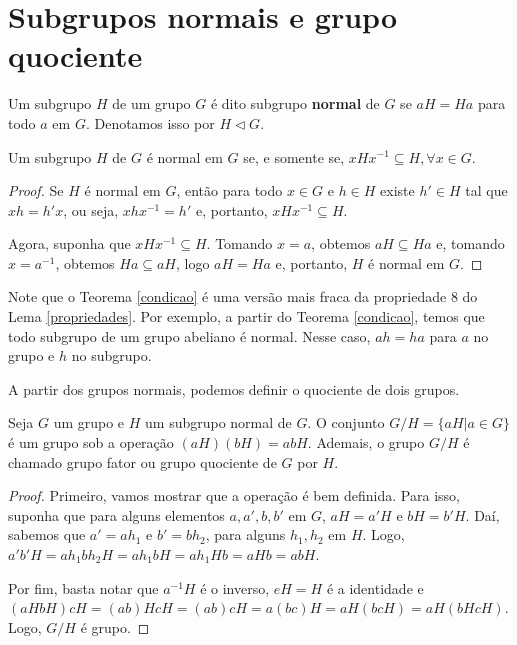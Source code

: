 \section{Subgrupos normais e grupo quociente}
\label{sec-subgrupos-normais}

    \begin{deff}
		Um subgrupo $H$ de um grupo $G$ é dito subgrupo \textbf{normal} de $G$ se $aH = Ha$ para todo $a$ em $G$. Denotamos isso por $H\vartriangleleft G$.
	\end{deff}
	
	\begin{theorem}
		\label{condicao}
		Um subgrupo $H$ de $G$ é normal em $G$ se, e somente se, $xHx^{-1}\subseteq H, \forall x\in G$. 
	\end{theorem} 
	
	\begin{proof}
		Se $H$ é normal em $G$, então para todo $x\in G$ e $h\in H$ existe $h'\in H$ tal que $xh = h'x$, ou seja, $xhx^{-1} = h'$ e, portanto, $xHx^{-1}\subseteq H.$
		\par\vspace{0.3cm} Agora, suponha que $xHx^{-1}\subseteq H$. Tomando $x=a$, obtemos $aH\subseteq Ha$ e, tomando $x = a^{-1}$, obtemos $Ha\subseteq aH$, logo $aH = Ha$ e, portanto, $H$ é normal em $G$.
	\end{proof}
	\par\vspace{0.3cm} Note que o Teorema \eqref{condicao} é uma versão mais fraca da propriedade 8 do Lema \eqref{propriedades}. Por exemplo, a partir do Teorema \eqref{condicao}, temos que todo subgrupo de um grupo abeliano é normal. Nesse caso, $ah = ha$ para $a$ no grupo e $h$ no subgrupo. 
	\par\vspace{0.3cm} A partir dos grupos normais, podemos definir o quociente de dois grupos.
	
	\begin{theorem}
		\label{quociente}
		Seja $G$ um grupo e $H$ um subgrupo normal de $G$. O conjunto $G/H = \{ aH|a\in G \}$ é um grupo sob a operação $(aH)(bH) = abH$. Ademais, o grupo $G/H$ é chamado grupo fator ou grupo quociente de $G$ por $H$.
	\end{theorem}
	
	\begin{proof}
		Primeiro, vamos mostrar que a operação é bem definida. Para isso, suponha que para alguns elementos $a, a', b, b'$ em $G$, $aH = a'H$ e $bH = b'H$. Daí, sabemos que $a' = ah_1$ e $b' = bh_2$, para alguns $h_1, h_2$ em $H$. Logo, $a'b'H = ah_1bh_2H = ah_1bH = ah_1Hb = aHb = abH$. 
		\par\vspace{0.3cm} Por fim, basta notar que $a^{-1}H$ é o inverso, $eH = H$ é a identidade e $(aHbH)cH = (ab)HcH = (ab)cH = a(bc)H = aH(bcH) = aH(bHcH)$. Logo, $G/H$ é grupo.
	\end{proof}
	
